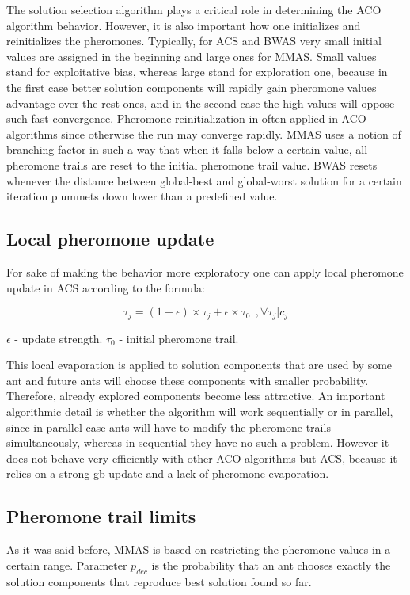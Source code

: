 \documentclass[11pt,a4paper,oneside]{book}
\begin{document}
The solution selection algorithm plays a critical role in determining the ACO algorithm behavior. However, it is also important how one initializes and reinitializes the pheromones. Typically, for ACS and BWAS very small initial values are assigned in the beginning and large ones for MMAS. Small values stand for exploitative bias, whereas large stand for exploration one, because in the first case better solution components will rapidly gain pheromone values advantage over the rest ones, and in the second case the high values will oppose such fast convergence. Pheromone reinitialization in often applied in ACO algorithms since otherwise the run may converge rapidly. MMAS uses a notion of branching factor in such a way that when it falls below a certain value, all pheromone trails are reset to the initial pheromone trail value. BWAS resets whenever the distance between global-best and global-worst solution for a certain iteration plummets down lower than a predefined value.


\subsection{Local pheromone update}
For sake of making the behavior more exploratory one can apply \cite{Dorigo1997} local pheromone update in ACS according to the formula:

\begin{equation}
\tau_j = (1 - \epsilon) \times \tau_j + \epsilon \times \tau_0 \ \ ,\forall \tau_j | c_j
\label{eq:local_update}
\end{equation}

$\epsilon$ - update strength. $\tau_0$ - initial pheromone trail.

This local evaporation is applied to solution components that are used by some ant and future ants will choose these components with smaller probability. Therefore, already explored components become less attractive. An important algorithmic detail is whether the algorithm will work sequentially or in parallel, since in parallel case ants will have to modify the pheromone trails simultaneously, whereas in sequential they have no such a problem. However it does not behave very efficiently with other ACO algorithms but ACS, because it relies on a strong gb-update and a lack of pheromone evaporation.

\subsection{Pheromone trail limits}
As it was said before, MMAS is based on restricting the pheromone values in a certain range. Parameter $p_{dec}$ is the probability that an ant chooses exactly the solution components that reproduce best solution found so far.
\end{document}
